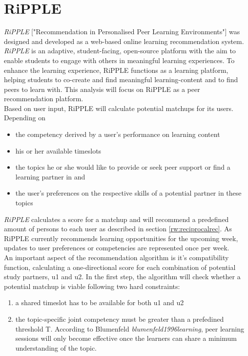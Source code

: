 \documentclass[nochapterpage,bigchapter,linedtoc,longdoc,colorback,accentcolor=tud3b,oneside]{tudreport}
\begin{document}
\section{RiPPLE} \label{paper:Ripple}
\textit{RiPPLE} ["Recommendation in Personalised Peer Learning Environments"] was designed and developed as a web-based online learning recommendation system. \textit{RiPPLE} is an adaptive, student-facing, open-source platform with the aim to enable students to engage with others in meaningful learning experiences. To enhance the learning experience, RiPPLE functions as a learning platform, helping students to co-create and find meaningful learning-content and to find peers to learn with. This analysis will focus on RiPPLE as a peer recommendation platform.\\
Based on user input, RiPPLE will calculate potential matchups for its users. Depending on
\begin{itemize}
	\item the competency derived by a user's performance on learning content
	\item his or her available timeslots
	\item the topics he or she would like to provide or seek peer support or find a learning partner in and
	\item the user's preferences on the respective skills of a potential partner in these topics
\end{itemize}
\textit{RiPPLE} calculates a score for a matchup and will recommend a predefined amount of persons to each user as described in section \ref{rw:reciprocalrec}. As RiPPLE currently recommends learning opportunities for the upcoming week, updates to user preferences or competencies are represented once per week.\\
An important aspect of the recommendation algorithm is it's compatibility function, calculating a one-directional score for each combination of potential study partners, u1 and u2. In the first step, the algorithm will check whether a potential matchup is viable following two hard constraints:
\begin{enumerate}
	\item a shared timeslot has to be available for both u1 and u2
	\item the topic-specific joint competency must be greater than a prefedined threshold T. According to Blumenfeld \textit{blumenfeld1996learning}, peer learning sessions will only become effective once the learners can share a minimum understanding of the topic.
\end{enumerate}
\end{document}
